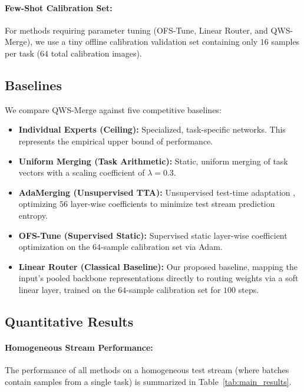 \paragraph{Few-Shot Calibration Set:} For methods requiring parameter tuning (OFS-Tune, Linear Router, and QWS-Merge), we use a tiny offline calibration validation set containing only $16$ samples per task ($64$ total calibration images).

\subsection{Baselines}
We compare QWS-Merge against five competitive baselines:
\begin{itemize}
    \item \textbf{Individual Experts (Ceiling):} Specialized, task-specific networks. This represents the empirical upper bound of performance.
    \item \textbf{Uniform Merging (Task Arithmetic):} Static, uniform merging of task vectors \cite{ilharco2022editing} with a scaling coefficient of $\lambda = 0.3$.
    \item \textbf{AdaMerging (Unsupervised TTA):} Unsupervised test-time adaptation \cite{liang2023adamerging}, optimizing $56$ layer-wise coefficients to minimize test stream prediction entropy.
    \item \textbf{OFS-Tune (Supervised Static):} Supervised static layer-wise coefficient optimization on the $64$-sample calibration set via Adam.
    \item \textbf{Linear Router (Classical Baseline):} Our proposed baseline, mapping the input's pooled backbone representations directly to routing weights via a soft linear layer, trained on the $64$-sample calibration set for $100$ steps.
\end{itemize}

\subsection{Quantitative Results}
\label{subsec:results}

\paragraph{Homogeneous Stream Performance:}
The performance of all methods on a homogeneous test stream (where batches contain samples from a single task) is summarized in Table~\ref{tab:main_results}.

